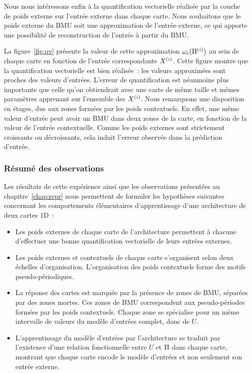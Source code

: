 \documentclass[../main]{subfiles}
\begin{document}
Nous nous intéressons enfin à la quantification vectorielle réalisée par la couche de poids externe sur l'entrée externe dans chaque carte. Nous souhaitons que le poids externe du BMU soit une approximation de l'entrée externe, ce qui apporte une possibilité de reconstruction de l'entrée à partir du BMU.

La figure~\ref{fig:qv} présente la valeur de cette approximation $\omega_{e}(\Pi^{({i})})$ au sein de chaque carte en fonction de l'entrée correspondante $X^{({i})}$. 
Cette figure montre que la quantification vectorielle est bien réalisée~: les valeurs approximées sont proches des valeurs d'entrées.
L'erreur de quantification est néanmoins plus importante que celle qu'on obtiendrait avec une carte de même taille et mêmes paramètres apprenant sur l'ensemble des $X^{({i})}$. 
Nous remarquons une disposition en étages, dus aux zones formées par les poids contextuels.
En effet, une même valeur d'entrée peut avoir un BMU dans deux zones de la carte, en fonction de la valeur de l'entrée contextuelle. 
Comme les poids externes sont strictement croissants ou décroissants, cela induit l'erreur observée dans la prédiction d'entrée.

\subsubsection{Résumé des observations}

Les résultats de cette expérience ainsi que les observations présentées au chapitre~\ref{chap:repr} nous permettent de formuler les hypothèses suivantes concernant les comportements élémentaires d'apprentissage d'une architecture de deux cartes 1D~:

\begin{itemize}
	\item Les poids externes de chaque carte de l'architecture permettent à chacune d'effectuer une bonne quantification vectorielle de leurs entrées externes.
	\item Les poids externes et contextuels de chaque carte s'organisent selon deux échelles d'organisation. L'organisation des poids contextuels forme des motifs pseudo-périodiques.
	\item La réponse des cartes est marquée par la présence de zones de BMU, séparées par des zones mortes. Ces zones de BMU correspondent aux pseudo-périodes formées par les poids contextuels. Chaque zone se spécialise pour un même intervalle de valeurs du modèle d'entrées complet, donc de $U$.
	\item L'apprentissage du modèle d'entrées par l'architecture se traduit par l'existence d'une relation fonctionnelle entre $U$ et $\Pi$ dans chaque carte, montrant que chaque carte encode le modèle d'entrées et non seulement son entrée externe.
\end{itemize}
\end{document}
